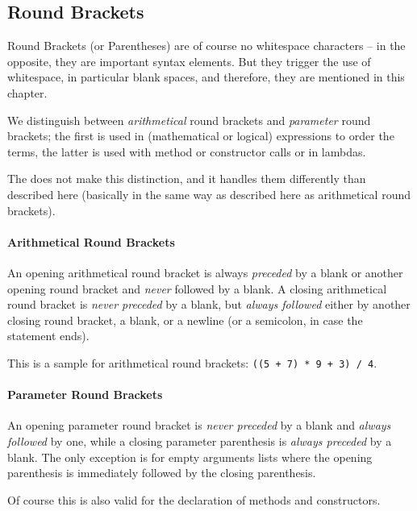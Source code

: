 \subsection{Round Brackets}\label{sec:Parenthesis}
Round Brackets (or Parentheses) are of course no whitespace characters – in the opposite, they are important syntax elements. But they trigger the use of whitespace, in particular blank spaces, and therefore, they are mentioned in this chapter.

We distinguish between \textit{arithmetical} round brackets and \textit{parameter} round brackets; the first is used in (mathematical or logical) expressions to order the terms, the latter is used with method or constructor calls or in lambdas.

The \autocite{SUN_CODE_CONVENTIONS:BlankSpaces} does not make this distinction, and it handles them differently than described here (basically in the same way as described here as arithmetical round brackets).

\paragraph{Arithmetical Round Brackets}
An opening arithmetical round bracket is always \textit{preceded} by a blank or another opening round bracket and \textit{never} followed by a blank. A closing arithmetical round bracket is \textit{never preceded} by a blank, but \textit{always followed} either by another closing round bracket, a blank, or a newline (or a semicolon, in case the statement ends).

This is a sample for arithmetical round brackets: \lstinline|((5 + 7) * 9 + 3) / 4|.

\paragraph{Parameter Round Brackets}\label{sec:ParameterParenthesis}
An opening parameter round bracket is \textit{never preceded} by a blank and \textit{always followed} by one, while a closing parameter parenthesis is \textit{always preceded} by a blank. The only exception is for empty arguments lists where the opening parenthesis is immediately followed by the closing parenthesis.

Of course this is also valid for the declaration of methods and constructors.

